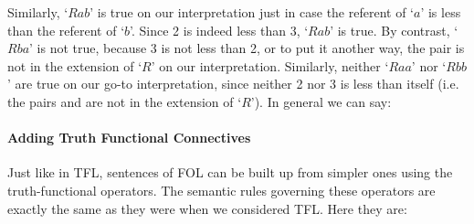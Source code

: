 Similarly, `$Rab$' is true on our interpretation just in case the referent of `$a$' is less than the referent of `$b$'.  Since 2 is indeed less than 3, `$Rab$' is true.  By contrast, `$Rba$' is not true, because 3 is not less than 2, or to put it another way, the pair  is not in the extension of `$R$' on our interpretation.  Similarly, neither `$Raa$' nor `$Rbb$' are true on our go-to interpretation, since neither 2 nor 3 is less than itself (i.e. the pairs  and  are not in the extension of `$R$').  In general we can say:


\paragraph{Adding Truth Functional Connectives} Just like in TFL, sentences of FOL can be built up from simpler ones using the truth-functional operators. The semantic rules governing these operators are exactly the same as they were when we considered TFL. Here they are:

